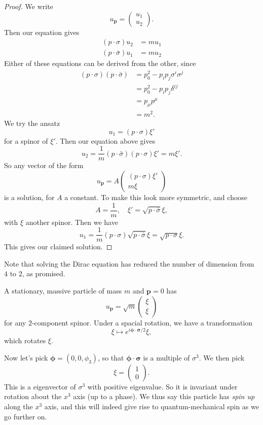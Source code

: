 \documentclass[a4paper]{article}
\begin{document}
\begin{proof}
  We write
  \[
    u_\mathbf{p} =
    \begin{pmatrix}
      u_1\\
      u_2
    \end{pmatrix}.
  \]
  Then our equation gives
  \begin{align*}
    (p\cdot \sigma) u_2 &= m u_1\\
    (p \cdot \bar\sigma) u_1 &= m u_2
  \end{align*}
  Either of these equations can be derived from the other, since
  \begin{align*}
    (p \cdot \sigma)(p \cdot \bar\sigma) &= p_0^2 - p_i p_j \sigma^i \sigma^j\\
    &= p_0^2 - p_i p_j \delta^{ij}\\
    &= p_\mu p^\mu \\
    &= m^2.
  \end{align*}
  We try the ansatz
  \[
    u_1 = (p \cdot \sigma) \xi'
  \]
  for a spinor of $\xi'$. Then our equation above gives
  \[
    u_2 = \frac{1}{m} (p \cdot \bar\sigma)(p \cdot \sigma) \xi' = m \xi'.
  \]
  So any vector of the form
  \[
    u_\mathbf{p} = A
    \begin{pmatrix}
     (p \cdot \sigma) \xi'\\
     m \xi
    \end{pmatrix}
  \]
  is a solution, for $A$ a constant. To make this look more symmetric, and choose
  \[
    A = \frac{1}{m},\quad \xi' = \sqrt{p \cdot \bar\sigma} \xi,
  \]
  with $\xi$ another spinor. Then we have
  \[
    u_1 = \frac{1}{m} (p\cdot \sigma)\sqrt{p \cdot \bar\sigma} \xi = \sqrt{p \cdot \sigma} \xi.
  \]
  This gives our claimed solution.
\end{proof}

Note that solving the Dirac equation has reduced the number of dimension from $4$ to $2$, as promised.

\begin{eg}
  A stationary, massive particle of mass $m$ and $\mathbf{p} = 0$ has
  \[
    u_\mathbf{p} = \sqrt{m}
    \begin{pmatrix}
      \xi\\ \xi
    \end{pmatrix}
  \]
  for any $2$-component spinor. Under a spacial rotation, we have a transformation
  \[
    \xi \mapsto e^{i \boldsymbol \phi\cdot \boldsymbol\sigma/2} \xi,
  \]
  which rotates $\xi$.

  Now let's pick $\boldsymbol\phi = (0, 0, \phi_3)$, so that $\boldsymbol\phi \cdot \boldsymbol\sigma$ is a multiple of $\sigma^3$. We then pick
   \[
    \xi =
    \begin{pmatrix}
      1 \\0
    \end{pmatrix}.
  \]
  This is a eigenvector of $\sigma^3$ with positive eigenvalue. So it is invariant under rotation about the $x^3$ axis (up to a phase). We thus say this particle has \emph{spin up} along the $x^3$ axis, and this will indeed give rise to quantum-mechanical spin as we go further on.
\end{eg}
\end{document}
